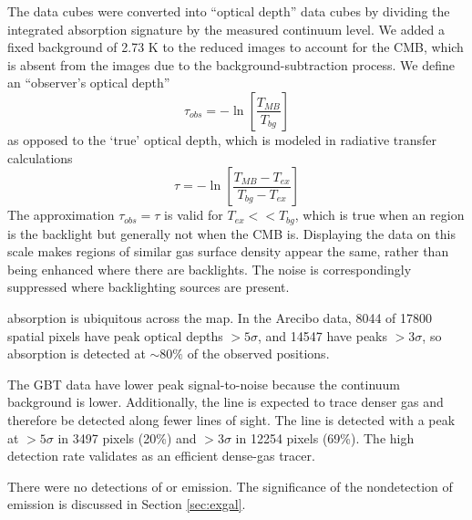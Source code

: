The data cubes were converted into ``optical depth'' data cubes by dividing the
integrated \formaldehyde absorption signature by the measured continuum level.
We added a fixed background of 2.73 K to the reduced images to account for the
CMB, which is absent from the images due to the background-subtraction
process.  We define an ``observer's optical depth''
\begin{equation}
    \tau_{obs} = -\ln\left[\frac{T_{MB}}{T_{bg}}\right]
\end{equation}
as opposed to the `true' optical depth, which is modeled in radiative transfer
calculations
\begin{equation}
    \tau = -\ln\left[\frac{T_{MB}-T_{ex}}{T_{bg}-T_{ex}}\right]
\end{equation}
The approximation $\tau_{obs} = \tau$ is valid for $T_{ex} << T_{bg}$, which is
true when an \hii region is the backlight but generally not when the CMB is.
Displaying the data on this scale makes regions of similar gas surface density
appear the same, rather than being enhanced where there are backlights.  The
noise is correspondingly suppressed where backlighting sources are present.


\formaldehyde absorption is ubiquitous across the map.  In the Arecibo data,
8044 of 17800 spatial pixels have peak optical depths $>5\sigma$, and 14547
have peaks $>3\sigma$, so \formaldehyde absorption is detected at $\sim80\%$ of
the observed positions.

The GBT \formaldehyde \twotwo data have lower peak signal-to-noise because the
continuum background is lower.  Additionally, the \twotwo line is expected to
trace denser gas and therefore be detected along fewer lines of sight.  The
\twotwo line is detected with a peak at $>5\sigma$ in 3497 pixels (20\%) and
$>3\sigma$ in 12254 pixels (69\%).  The high detection rate validates
\formaldehyde as an efficient dense-gas tracer.

There were no detections of \formaldehyde \oneone or \twotwo emission.  The
significance of the nondetection of emission is discussed in Section
\ref{sec:exgal}.

